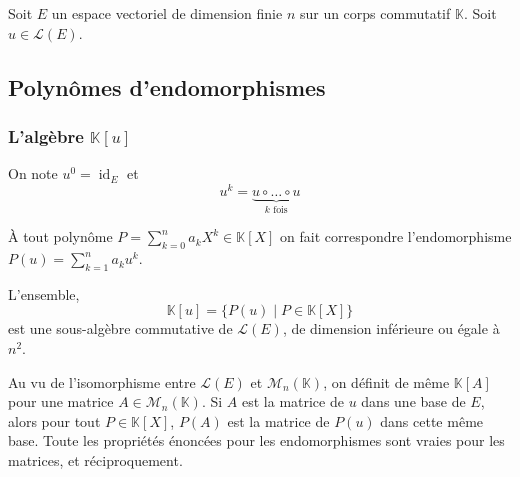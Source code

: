 




  Soit $E$ un espace vectoriel de dimension finie $n$ sur un corps commutatif $\mathbb{K}$. Soit $u \in \mathcal{L}(E)$.

  \subsection{Polynômes d'endomorphismes}

  \subsubsection{L'algèbre \texorpdfstring{$\mathbb{K}[u]$}{K[u]}}


  \begin{notation}
    On note $u^0 = \operatorname{id}_E$ et
    \[ u^k = \underbrace{u \circ \dots \circ u}_{k \text{ fois}} \]
  \end{notation}

  \begin{definition}
    À tout polynôme $P = \sum_{k=0}^{n} a_k X^k \in \mathbb{K}[X]$ on fait correspondre l'endomorphisme $P(u) = \sum_{k=1}^{n} a_k u^k$.
  \end{definition}

  \begin{proposition}
    L'ensemble,
    \[ \mathbb{K}[u] = \{ P(u) \mid P \in \mathbb{K}[X] \} \]
    est une sous-algèbre commutative de $\mathcal{L}(E)$, de dimension inférieure ou égale à $n^2$.
  \end{proposition}

  \begin{remark}
    Au vu de l'isomorphisme entre $\mathcal{L}(E)$ et $\mathcal{M}_n(\mathbb{K})$, on définit de même $\mathbb{K}[A]$ pour une matrice $A \in \mathcal{M}_n(\mathbb{K})$. Si $A$ est la matrice de $u$ dans une base de $E$, alors pour tout $P \in \mathbb{K}[X]$, $P(A)$ est la matrice de $P(u)$ dans cette même base. Toute les propriétés énoncées pour les endomorphismes sont vraies pour les matrices, et réciproquement.
  \end{remark}



